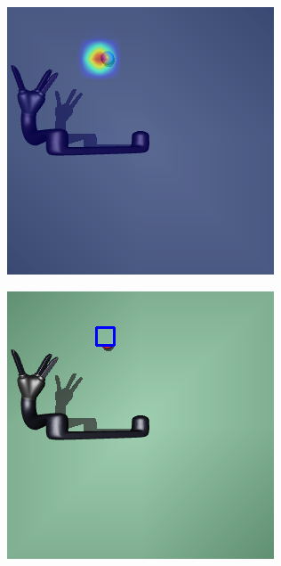 \begin{figure}
  \begin{subfigure}{0.32\columnwidth}
    \includegraphics[width=\linewidth]{figures/chapter6/occ_jaco_average_map.png}
  \end{subfigure}
  \begin{subfigure}{0.32\columnwidth}
    \includegraphics[width=\linewidth]{figures/chapter6/average_map_mask.png}

\end{subfigure}
\end{figure}
